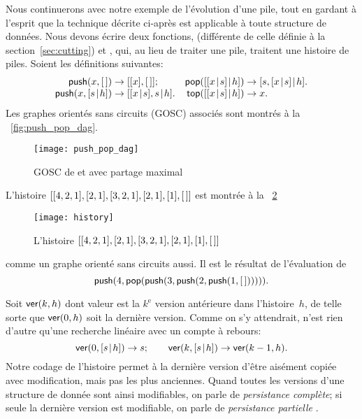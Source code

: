 Nous continuerons avec notre exemple de l'évolution d'une pile, tout
en gardant à l'esprit que la technique décrite ci-après est applicable
à toute structure de données. Nous devons écrire deux fonctions,
 (différente de celle définie à
la section~\ref{sec:cutting}) et ,
qui, au lieu de traiter une pile, traitent une histoire de
piles. Soient les définitions suivantes:
\begin{equation}
\begin{array}{@{}r@{\;}c@{\;}l@{\quad}r@{\;}c@{\;}l@{}}
\fun{push}(x,\el) & \rightarrow & [[x],\el];
& \fun{pop}(\cons{\cons{x}{s}}{h}) & \rightarrow &
                                     \cons{s,\cons{x}{s}}{h}.\\
\fun{push}(x,\cons{s}{h}) & \rightarrow &
\cons{\cons{x}{s},s}{h}. &
\fun{top}(\cons{\cons{x}{s}}{h}) & \rightarrow & x.
\end{array}
\label{eq:push_pop_persistence}
\end{equation}
Les graphes orientés sans circuits (GOSC) associés sont montrés à la
\fig~\vref{fig:push_pop_dag}.
\begin{figure}[t]
\centering
\texttt{[image: push\_pop\_dag]}
\caption{GOSC de  et  avec partage maximal}
\label{fig:push_pop_dag}
\end{figure}
L'histoire \([[4,2,1],[2,1],[3,2,1],[2,1],[1],[\,]]\) est montrée
à la \fig~\ref{fig:history}
\begin{figure}
\centering
\texttt{[image: history]}
\caption{L'histoire \([[4,2,1],[2,1],[3,2,1],[2,1],[1],[\,]]\)}
\label{fig:history}
\end{figure}
comme un graphe orienté sans circuits aussi. Il est le résultat de
l'évaluation de
\begin{equation}
\textsf{push}(4, \textsf{pop}(\textsf{push}(3, \textsf{push}(2,
\textsf{push}(1, [\,]))))).
\label{ex_history}
\end{equation}

Soit \(\textsf{ver}(k,h)\)  dont valeur est la
\(k^\text{e}\) version antérieure dans l'histoire~\(h\), de telle
sorte que \(\textsf{ver}(0,h)\) soit la dernière version. Comme on s'y
attendrait,  n'est rien d'autre qu'une recherche linéaire
avec un compte à rebours:
\begin{equation*}
\textsf{ver}(0,[{s}\!\mid\!{h}]) \rightarrow s;\qquad
\textsf{ver}(k,[{s}\!\mid\!{h}]) \rightarrow \textsf{ver}(k-1,h).
\end{equation*}
Notre codage de l'histoire permet à la dernière version d'être
aisément copiée avec modification, mais pas les plus anciennes. Quand
toutes les versions d'une structure de donnée sont ainsi modifiables,
on parle de \emph{persistance complète}; si seule la dernière version est modifiable, on parle de
\emph{persistance partielle}
\citep{MehlhornTsakalidis_1990}.

